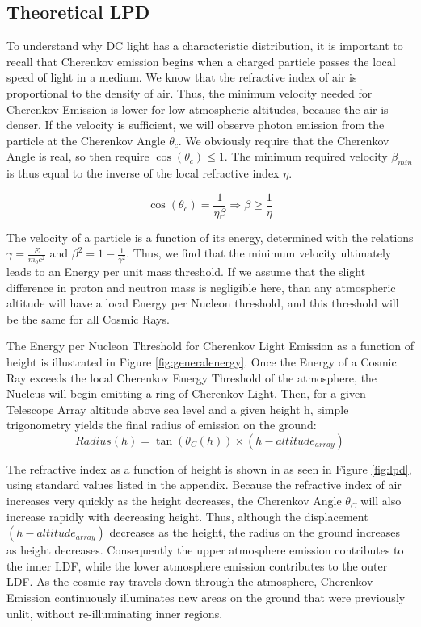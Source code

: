 \documentclass[11pt]{article}
\begin{document}
\subsection{Theoretical LPD}
To understand why DC light has a characteristic distribution, it is important to recall that Cherenkov emission begins when a charged particle passes the local speed of light in a medium.  We know that the refractive index of air is proportional to the density of air. Thus, the minimum velocity needed for Cherenkov Emission is lower for low atmospheric altitudes, because the air is denser. If the velocity is sufficient, we will observe photon emission from the particle at the Cherenkov Angle $\theta_{c}$. We obviously require that the Cherenkov Angle is real, so then require $\cos(\theta_{c}) \leq 1$. The minimum required velocity $\beta_{min}$ is thus equal to the inverse of the local refractive index $\eta$. 

\[ \cos(\theta_{c}) = \frac{1}{\eta \beta}  \Longrightarrow \beta \geq \frac{1}{\eta}\]

The velocity of a particle is a function of its energy, determined with the relations $\gamma = \frac{E}{m_{0} c^{2}}$ and $\beta^{2} = 1 - \frac{1}{\gamma ^{2}}$. Thus, we find that the minimum velocity ultimately leads to an Energy per unit mass threshold. If we assume that the slight difference in proton and neutron mass is negligible here, than any atmospheric altitude will have a local Energy per Nucleon threshold, and this threshold will be the same for all Cosmic Rays. 

The Energy per Nucleon Threshold for Cherenkov Light Emission as a function of height is illustrated in Figure \ref{fig:generalenergy}. Once the Energy of a Cosmic Ray exceeds the local Cherenkov Energy Threshold of the atmosphere, the Nucleus will begin emitting a ring of Cherenkov Light.  Then, for a given Telescope Array altitude above sea level and a given height h, simple trigonometry yields the final radius of emission on the ground:
\[ Radius(h) = \tan (\theta_{C}(h)) \times (h - altitude_{array})\]

The refractive index as a function of height is shown in as seen in Figure \ref{fig:lpd}, using standard values listed in the appendix. Because the refractive index of air increases very quickly as the height decreases, the Cherenkov Angle $\theta_{C}$ will also increase rapidly with decreasing height. Thus, although the displacement $(h - altitude_{array})$ decreases as the height, the radius on the ground increases as height decreases. Consequently the upper atmosphere emission contributes to the inner LDF, while the lower atmosphere emission contributes to the outer LDF. As the cosmic ray travels down through the atmosphere, Cherenkov Emission continuously illuminates new areas on the ground that were previously unlit, without re-illuminating inner regions. 
\end{document}

